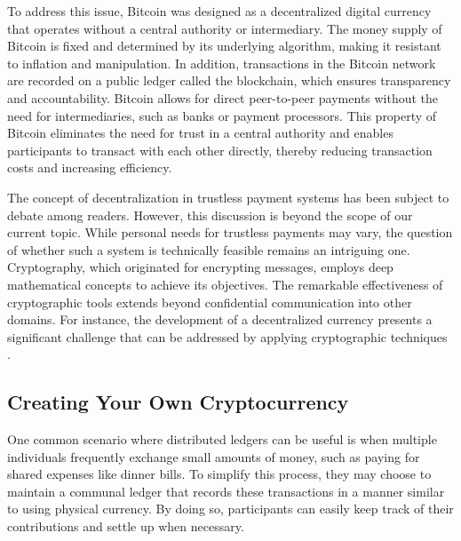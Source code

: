 To address this issue, Bitcoin was designed as a decentralized digital currency that operates without a central authority or intermediary. The money supply of Bitcoin is fixed and determined by its underlying algorithm, making it resistant to inflation and manipulation. In addition, transactions in the Bitcoin network are recorded on a public ledger called the blockchain, which ensures transparency and accountability. Bitcoin allows for direct peer-to-peer payments without the need for intermediaries, such as banks or payment processors. This property of Bitcoin eliminates the need for trust in a central authority and enables participants to transact with each other directly, thereby reducing transaction costs and increasing efficiency.

The concept of decentralization in trustless payment systems has been subject to debate among readers. However, this discussion is beyond the scope of our current topic. While personal needs for trustless payments may vary, the question of whether such a system is technically feasible remains an intriguing one. Cryptography, which originated for encrypting messages, employs deep mathematical concepts to achieve its objectives. The remarkable effectiveness of cryptographic tools extends beyond confidential communication into other domains. For instance, the development of a decentralized currency presents a significant challenge that can be addressed by applying cryptographic techniques \cite{diffie2022new}.

\subsection{Creating Your Own Cryptocurrency}
One common scenario where distributed ledgers can be useful is when multiple individuals frequently exchange small amounts of money, such as paying for shared expenses like dinner bills. To simplify this process, they may choose to maintain a communal ledger that records these transactions in a manner similar to using physical currency. By doing so, participants can easily keep track of their contributions and settle up when necessary.